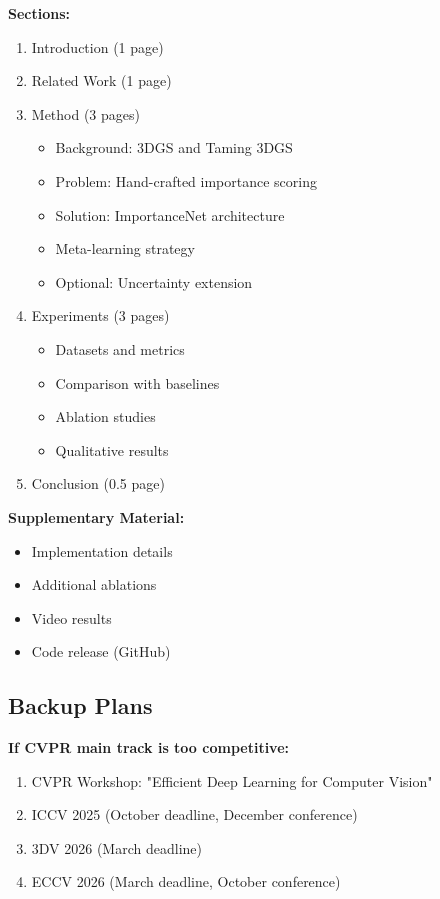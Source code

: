 \documentclass[11pt,letterpaper]{article}
\begin{document}
\textbf{Sections:}
\begin{enumerate}[leftmargin=*]
    \item Introduction (1 page)
    \item Related Work (1 page)
    \item Method (3 pages)
    \begin{itemize}
        \item Background: 3DGS and Taming 3DGS
        \item Problem: Hand-crafted importance scoring
        \item Solution: ImportanceNet architecture
        \item Meta-learning strategy
        \item Optional: Uncertainty extension
    \end{itemize}
    \item Experiments (3 pages)
    \begin{itemize}
        \item Datasets and metrics
        \item Comparison with baselines
        \item Ablation studies
        \item Qualitative results
    \end{itemize}
    \item Conclusion (0.5 page)
\end{enumerate}

\textbf{Supplementary Material:}
\begin{itemize}[leftmargin=*]
    \item Implementation details
    \item Additional ablations
    \item Video results
    \item Code release (GitHub)
\end{itemize}

\subsection{Backup Plans}

\textbf{If CVPR main track is too competitive:}
\begin{enumerate}[leftmargin=*]
    \item CVPR Workshop: "Efficient Deep Learning for Computer Vision"
    \item ICCV 2025 (October deadline, December conference)
    \item 3DV 2026 (March deadline)
    \item ECCV 2026 (March deadline, October conference)
\end{enumerate}
\end{document}
